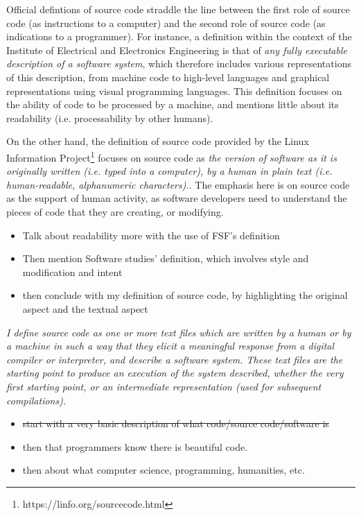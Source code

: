 Official defintions of source code straddle the line between the first role of source code (as instructions to a computer) and the second role of source code (as indications to a programmer). For instance, a definition within the context of the Institute of Electrical and Electronics Engineering is that of \emph{any fully executable description of a software system}, which therefore includes various representations of this description, from machine code to high-level languages and graphical representations using visual programming languages\cite{harman_why_2010}. This definition focuses on the ability of code to be processed by a machine, and mentions little about its readability (i.e. processability by other humans).

On the other hand, the definition of source code provided by the Linux Information Project\footnote{https://linfo.org/sourcecode.html} focuses on source code as \emph{the version of software as it is originally written (i.e. typed into a computer), by a human in plain text (i.e. human-readable, alphanumeric characters).}\cite{noauthor_source_nodate}. The emphasis here is on source code as the support of human activity, as software developers need to understand the pieces of code that they are creating, or modifying.

\begin{itemize}
    \item Talk about readability more with the use of FSF's definition
    \item Then mention Software studies' definition, which involves style and modification and intent
    \item then conclude with my definition of source code, by highlighting the original aspect and the textual aspect
\end{itemize}

\emph{I define source code as one or more text files which are written by a human or by a machine in such a way that they elicit a meaningful response from a digital compiler or interpreter, and describe a software system. These text files are the starting point to produce an execution of the system described, whether the very first starting point, or an intermediate representation (used for subsequent compilations).}

\begin{itemize}
    \item \sout{start with a very basic description of what code/source code/software is}
    \item then that programmers know there is beautiful code.
    \item then about what computer science, programming, humanities, etc.
\end{itemize}

